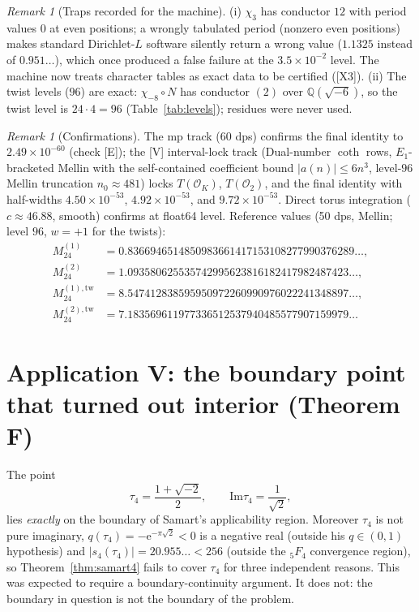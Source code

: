 \documentclass[11pt]{article}
\newcommand{\Qq}{\mathbb{Q}}
\newcommand{\e}{\mathrm{e}}
\newcommand{\OO}{\mathcal{O}}
\newcommand{\ImT}{\mathrm{Im}}
\theoremstyle{definition}
\theoremstyle{remark}
\newtheorem{remark}[theorem]{Remark}
\begin{document}
\begin{remark}[Traps recorded for the machine]
(i) $\chi_3$ has conductor $12$ with period values $0$ at even
positions; a wrongly tabulated period (nonzero even positions) makes
standard Dirichlet-$L$ software silently return a wrong value
($1.1325$ instead of $0.951\ldots$), which once produced a false
failure at the $3.5\times10^{-2}$ level. The machine now treats
character tables as exact data to be certified ([X3]). (ii) The
twist levels ($96$) are exact: $\chi_{-8}\circ N$ has conductor $(2)$
over $\Qq(\sqrt{-6})$, so the twist level is $24\cdot4=96$
(Table~\ref{tab:levels}); residues were never used.
\end{remark}

\begin{remark}[Confirmations]
The mp track (60 dps) confirms the final identity to
$2.49\times10^{-60}$ (check [E]); the [V] interval-lock track
(Dual-number $\coth$ rows, $E_1$-bracketed Mellin with the
self-contained coefficient bound $|a(n)|\le6n^3$, level-$96$ Mellin
truncation $n_0\approx481$) locks $T(\OO_K)$, $T(\OO_2)$, and the
final identity with half-widths $4.50\times10^{-53}$,
$4.92\times10^{-53}$, and $9.72\times10^{-53}$. Direct torus
integration ($c\approx46.88$, smooth) confirms at float64 level.
Reference values (50 dps, Mellin; level $96$, $w=+1$ for the twists):
\begin{align*}
  M_{24}^{(1)}&=0.8366946514850983661417153108277990376289\ldots,\\
  M_{24}^{(2)}&=1.093580625535742995623816182417982487423\ldots,\\
  M_{24}^{(1),\mathrm{tw}}&=8.547412838595950972260990976022241348897
   \ldots,\\
  M_{24}^{(2),\mathrm{tw}}&=7.183569611977336512537940485577907159979
   \ldots
\end{align*}
\end{remark}

\section{Application V: the boundary point that turned out interior
(Theorem F)}\label{sec:app5}

The point
\[
  \tau_4=\frac{1+\sqrt{-2}}2,\qquad \ImT\tau_4=\frac1{\sqrt2},
\]
lies \emph{exactly} on the boundary of Samart's applicability region.
Moreover $\tau_4$ is not pure imaginary,
$q(\tau_4)=-\e^{-\pi\sqrt2}<0$ is a negative real (outside
his $q\in(0,1)$ hypothesis) and $|s_4(\tau_4)|=20.955\ldots<256$
(outside the ${}_5F_4$ convergence region), so
Theorem~\ref{thm:samart4} fails to cover $\tau_4$ for three
independent
reasons. This was expected to require a boundary-continuity argument.
It does not: the boundary in question is not the boundary of the
problem.
\end{document}
